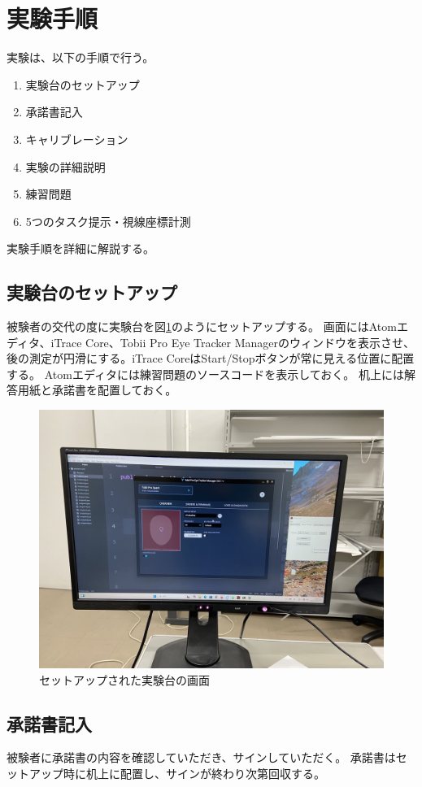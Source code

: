 \documentclass[paper=a4paper,fontsize=11pt]{jlreq}
\begin{document}
  \section{実験手順}
    実験は、以下の手順で行う。
    \begin{enumerate}
      \item 実験台のセットアップ
      \item 承諾書記入
      \item キャリブレーション
      \item 実験の詳細説明
      \item 練習問題
      \item 5つのタスク提示・視線座標計測
    \end{enumerate}
    実験手順を詳細に解説する。

    \subsection{実験台のセットアップ}
      被験者の交代の度に実験台を図\ref{実験台}のようにセットアップする。
      画面にはAtomエディタ、iTrace Core、Tobii Pro Eye Tracker Managerのウィンドウを表示させ、
      後の測定が円滑にする。iTrace CoreはStart/Stopボタンが常に見える位置に配置する。
      Atomエディタには練習問題のソースコードを表示しておく。
      机上には解答用紙と承諾書を配置しておく。

      \begin{figure}[h]
        \centering
        \includegraphics[height=0.5\linewidth]{実験台.jpg}
        \caption{セットアップされた実験台の画面}
        \label{実験台}
      \end{figure}
    
    \subsection{承諾書記入}
      被験者に承諾書の内容を確認していただき、サインしていただく。
      承諾書はセットアップ時に机上に配置し、サインが終わり次第回収する。
    
\end{document}
